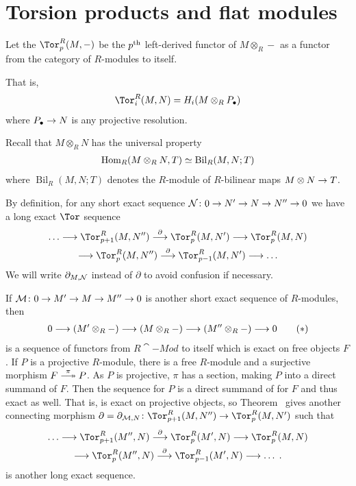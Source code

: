 \documentclass[a4paper,parskip=half,numbers=enddot, DIV=12]{scrreprt}
\begin{document}
\section{Torsion products and flat modules}
\begin{defi}
	Let the  $\Tor_p^R(M,-)$ be the $p^{\text{th}}$ left-derived functor of $M\otimes_R -$ as a functor from the category of $R$-modules to itself. 
\end{defi}
That is, 
\begin{align}\lbl{eq:TorDef}
	\Tor_i^R(M,N)=H_i(M\otimes_RP_\bullet)
\end{align}
where $P_\bullet \morphism N$ is any projective resolution.
\begin{rem*}
	\begin{alphanumerate}
		\item Recall that $M\otimes_RN$ has the universal property
		\begin{align*}
			\operatorname{Hom}_R(M\otimes_RN,T)\simeq \operatorname{Bil}_R(M,N;T)
		\end{align*}
		where $\operatorname{Bil}_R(M,N;T)$ denotes the $R$-module of $R$-bilinear maps $M\otimes N\morphism T$.
		\item By definition, for any short exact sequence $\Nn\colon 0\morphism N'\morphism N\morphism N''\morphism 0$ we have a long exact $\Tor$ sequence 
		\begin{multline}\lbl{eq:TorSeq1}
			\ldots\morphism\Tor_{p+1}^R(M,N'')\morphism[\partial]\Tor_p^R(M,N')\morphism\Tor_p^R(M,N)\\
			\morphism\Tor_p^R(M,N'')\morphism[\partial]\Tor_{p-1}^R(M,N')\morphism\ldots
		\end{multline}
		We will write $\partial_{M,\mathcal{N}}$ instead of $\partial$ to avoid confusion if necessary.
		
		If $\Mm\colon 0\morphism M'\morphism M\morphism M''\morphism 0$ is another short exact sequence of $R$-modules, then
		\begin{align}\lbl{eq:TorFuncSeq}
			0\morphism (M'\otimes_R -)\morphism (M\otimes _R-)\morphism (M''\otimes_R-)\morphism 0\tag{$*$}
		\end{align}
		is a sequence of functors from $R\cat{-Mod}$ to itself which is exact on free objects $F$. If $P$ is a projective $R$-module, there is a free $R$-module and a surjective morphism $F\epimorphism[\pi]P$. As $P$ is projective, $\pi$ has a section, making $P$ into a direct summand of $F$. Then the sequence  for $P$ is a direct summand of  for $F$ and thus exact as well. That is,  is exact on projective objects, so Theorem~ gives another connecting morphism $\partial=\partial_{\Mm,N}\colon \Tor_{p+1}^R(M,N'')\morphism\Tor_p^R(M,N')$ such that
		\begin{multline}\lbl{eq:TorSeq2}
			\ldots\morphism\Tor_{p+1}^R(M'',N)\morphism[\partial]\Tor_p^R(M',N)\morphism\Tor_p^R(M,N)\\
			\morphism\Tor_p^R(M'',N)\morphism[\partial]\Tor_{p-1}^R(M',N)\morphism\ldots\;.
		\end{multline}
		is another long exact sequence.
	\end{alphanumerate}
\end{rem*}
\end{document}
